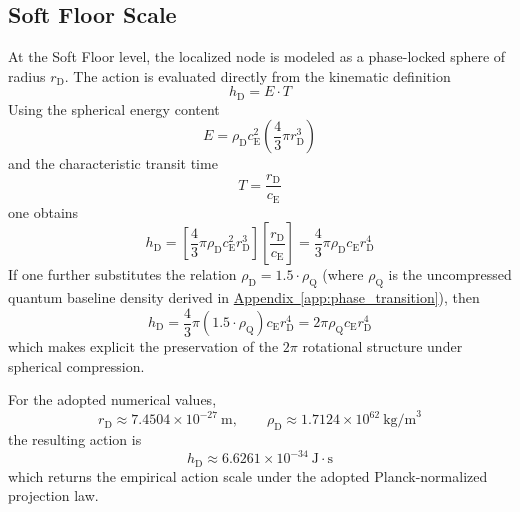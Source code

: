\subsection{Soft Floor Scale}
At the Soft Floor level, the localized node is modeled as a phase-locked sphere of radius $r_{\mathrm{D}}$. The action is evaluated directly from the kinematic definition
\begin{equation}
    h_{\mathrm{D}} = E \cdot T
\end{equation}
Using the spherical energy content
\begin{equation}
    E = \rho_{\mathrm{D}} c_{\mathrm{E}}^2\left(\frac{4}{3}\pi r_{\mathrm{D}}^3\right)
\end{equation}
and the characteristic transit time
\begin{equation}
    T = \frac{r_{\mathrm{D}}}{c_{\mathrm{E}}}
\end{equation}
one obtains
\begin{equation}
    h_{\mathrm{D}} = \left[\frac{4}{3}\pi \rho_{\mathrm{D}} c_{\mathrm{E}}^2 r_{\mathrm{D}}^3\right] \left[\frac{r_{\mathrm{D}}}{c_{\mathrm{E}}}\right] = \frac{4}{3}\pi \rho_{\mathrm{D}} c_{\mathrm{E}} r_{\mathrm{D}}^4
\end{equation}
If one further substitutes the relation $\rho_{\mathrm{D}} = 1.5 \cdot \rho_{\mathrm{Q}}$ (where $\rho_{\mathrm{Q}}$ is the uncompressed quantum baseline density derived in \hyperref[app:phase_transition]{Appendix~\ref*{app:phase_transition}}), then
\begin{equation}
    h_{\mathrm{D}} = \frac{4}{3}\pi (1.5 \cdot \rho_{\mathrm{Q}})c_{\mathrm{E}} r_{\mathrm{D}}^4 = 2\pi \rho_{\mathrm{Q}} c_{\mathrm{E}} r_{\mathrm{D}}^4
\end{equation}
which makes explicit the preservation of the $2\pi$ rotational structure under spherical compression.

For the adopted numerical values,
\begin{equation}
    r_{\mathrm{D}} \approx 7.4504 \times 10^{-27}\ \text{m}, \qquad \rho_{\mathrm{D}} \approx 1.7124 \times 10^{62}\ \text{kg/m}^3
\end{equation}
the resulting action is
\begin{equation}
    h_{\mathrm{D}} \approx 6.6261 \times 10^{-34}\ \text{J}\cdot\text{s}
\end{equation}
which returns the empirical action scale under the adopted Planck-normalized projection law.

